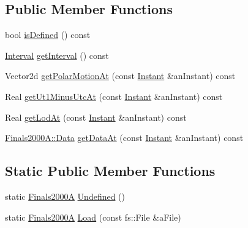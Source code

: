 \subsection*{Public Member Functions}
\begin{DoxyCompactItemize}
\item 
bool \hyperlink{classostk_1_1physics_1_1coord_1_1frame_1_1provider_1_1iers_1_1_finals2000_a_ac1214bb5570078e02ff8dc56bc846e9c}{is\+Defined} () const
\item 
\hyperlink{classostk_1_1physics_1_1time_1_1_interval}{Interval} \hyperlink{classostk_1_1physics_1_1coord_1_1frame_1_1provider_1_1iers_1_1_finals2000_a_a80c02efda876c2359d5f26a5804dff2d}{get\+Interval} () const
\item 
Vector2d \hyperlink{classostk_1_1physics_1_1coord_1_1frame_1_1provider_1_1iers_1_1_finals2000_a_acbe4bbe907144a93e2746b482e7d1e99}{get\+Polar\+Motion\+At} (const \hyperlink{classostk_1_1physics_1_1time_1_1_instant}{Instant} \&an\+Instant) const
\item 
Real \hyperlink{classostk_1_1physics_1_1coord_1_1frame_1_1provider_1_1iers_1_1_finals2000_a_af466fab804c2eed95804a0670e90e3dd}{get\+Ut1\+Minus\+Utc\+At} (const \hyperlink{classostk_1_1physics_1_1time_1_1_instant}{Instant} \&an\+Instant) const
\item 
Real \hyperlink{classostk_1_1physics_1_1coord_1_1frame_1_1provider_1_1iers_1_1_finals2000_a_a3c0b965e872a454f69cf7dbcf4fb61d8}{get\+Lod\+At} (const \hyperlink{classostk_1_1physics_1_1time_1_1_instant}{Instant} \&an\+Instant) const
\item 
\hyperlink{structostk_1_1physics_1_1coord_1_1frame_1_1provider_1_1iers_1_1_finals2000_a_1_1_data}{Finals2000\+A\+::\+Data} \hyperlink{classostk_1_1physics_1_1coord_1_1frame_1_1provider_1_1iers_1_1_finals2000_a_ae945e5caae2390991db7eae67ba34016}{get\+Data\+At} (const \hyperlink{classostk_1_1physics_1_1time_1_1_instant}{Instant} \&an\+Instant) const
\end{DoxyCompactItemize}
\subsection*{Static Public Member Functions}
\begin{DoxyCompactItemize}
\item 
static \hyperlink{classostk_1_1physics_1_1coord_1_1frame_1_1provider_1_1iers_1_1_finals2000_a}{Finals2000A} \hyperlink{classostk_1_1physics_1_1coord_1_1frame_1_1provider_1_1iers_1_1_finals2000_a_a78af6630d9b4b0cac43e41b0da25a54f}{Undefined} ()
\item 
static \hyperlink{classostk_1_1physics_1_1coord_1_1frame_1_1provider_1_1iers_1_1_finals2000_a}{Finals2000A} \hyperlink{classostk_1_1physics_1_1coord_1_1frame_1_1provider_1_1iers_1_1_finals2000_a_a914784bcc11e8eb6c2feedd288433a8f}{Load} (const fs\+::\+File \&a\+File)
\end{DoxyCompactItemize}
